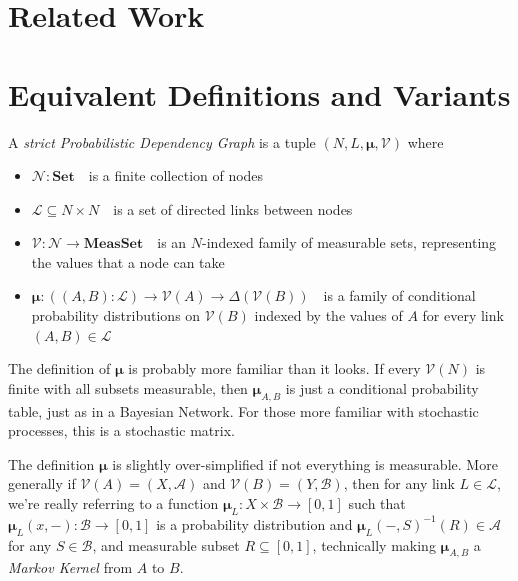 \documentclass{article}
\newcommand{\modelname}{Probabilistic Dependency Graph}
\newcommand\Set{\textbf{Set}}
\newcommand\MeasSet{\textbf{MeasSet}}
\newcommand\bmu{\boldsymbol{\mu}}
\begin{document}
	
	\section{Related Work}




	\section{Equivalent Definitions and Variants}


	\begin{defn}\label{def:model}
		A \emph{strict \modelname} is a tuple $(N, L, \bmu, \mathcal V)$ where
		\begin{itemize}[nosep]
			\item $\mathcal N : \Set$~~is a finite collection of nodes
			\item $\mathcal L \subseteq N \times N$~~is a set of directed links between nodes
			\item $\mathcal V : \mathcal N \to \MeasSet $~~is an $N$-indexed family of measurable sets, representing the values that a node can take
			\item $\bmu: ((A,B): \mathcal L) \to \mathcal V(A) \to \Delta(\mathcal{V}(B))$~~is a family of conditional probability distributions on $\mathcal V(B)$ indexed by the values of $A$ for every link $(A,B) \in \mathcal L$ %

		\end{itemize}
	\end{defn}

	The definition of $\bmu$ is probably more familiar than it looks. If every $\mathcal V(N)$ is finite with all subsets measurable, then $\bmu_{A,B}$ is just a conditional probability table, just as in a Bayesian Network. For those more familiar with stochastic processes, this is a stochastic matrix. 

	The definition $\bmu$ is slightly over-simplified if not everything is measurable. More generally if $\mathcal V(A) = (X, \mathcal A)$ and $\mathcal V(B) = (Y, \mathcal B)$, then for any link $L \in \mathcal L$, we're really referring to a function $\bmu_L : X \times \mathcal B \to [0,1]$ such that $\bmu_L(x,-): \mathcal B \to [0,1]$ is a probability distribution and $\bmu_L(-, S)^{-1}(R) \in \mathcal A$ for any $S \in \mathcal B$, and measurable subset $R \subseteq [0,1]$, technically making $\bmu_{A,B}$ a \textit{Markov Kernel} from $A$ to $B$.
\end{document}
